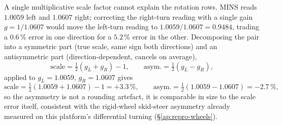 A single multiplicative scale factor cannot explain the rotation rows. MINS
reads $1.0059$ left and $1.0607$ right; correcting the right-turn reading with
a single gain $g=1/1.0607$ would move the left-turn reading to
$1.0059/1.0607 = 0.9484$, trading a $0.6\,\%$ error in one direction for a
$5.2\,\%$ error in the other. Decomposing the pair into a symmetric part
(true scale, same sign both directions) and an antisymmetric part
(direction-dependent, cancels on average),
\begin{equation}
\text{scale} = \tfrac12(g_L+g_R) - 1, \qquad
\text{asym.} = \tfrac12(g_L-g_R),
\label{eq:asym}
\end{equation}
applied to $g_L=1.0059$, $g_R=1.0607$ gives
\begin{equation}
\text{scale} = \tfrac12(1.0059+1.0607)-1 = +3.3\,\%, \qquad
\text{asym.} = \tfrac12(1.0059-1.0607) = -2.7\,\% ,
\label{eq:asymval}
\end{equation}
so the asymmetry is not a rounding artefact, it is comparable in size to
the scale error itself, consistent with the rigid-wheel skid-steer asymmetry
already measured on this platform's differential turning
(\S\ref{ap:repro-wheels}).
\begin{center}
\end{center}
